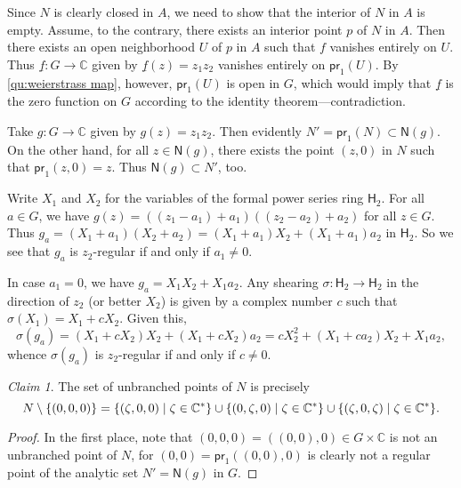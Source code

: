 \documentclass[a4paper]{amsart}
\newcommand{\C}{\mathbb{C}}
\newcommand{\Zero}[1]{\mathsf{N}(#1)}
\newcommand{\RingH}[1]{\mathsf{H}_{#1}}
\newcommand{\pr}[1]{\mathsf{pr}_{#1}}
\theoremstyle{remark}
\newtheorem{claim}{Claim}[question]
\numberwithin{equation}{question}
\DeclarePairedDelimiter\set{\{}{\}}
\begin{document}
\begin{solution}%
\begin{solenum}
\item Since $N$ is clearly closed in $A$, we need to show that the interior of $N$ in $A$ is empty. Assume, to the contrary, there exists an interior point $p$ of $N$ in $A$. Then there exists an open neighborhood $U$ of $p$ in $A$ such that $f$ vanishes entirely on $U$. Thus $\underline f \colon G \to \C$ given by $\underline f(z) = z_1z_2$ vanishes entirely on $\pr1(U)$. By \cref{qu:weierstrass map}, however, $\pr1(U)$ is open in $G$, which would imply that $\underline f$ is the zero function on $G$ according to the identity theorem---contradiction.

\item Take $g \colon G \to \C$ given by $g(z) = z_1z_2$. Then evidently $N' = \pr1(N) \subset \Zero g$. On the other hand, for all $z \in \Zero g$, there exists the point $(z,0)$ in $N$ such that $\pr1(z,0) = z$. Thus $\Zero g \subset N'$, too.

\item Write $X_1$ and $X_2$ for the variables of the formal power series ring $\RingH2$. For all $a \in G$, we have $g(z) = ((z_1 - a_1) + a_1)((z_2 - a_2) + a_2)$ for all $z \in G$. Thus $g_a = (X_1 + a_1)(X_2 + a_2) = (X_1 + a_1)X_2 + (X_1 + a_1)a_2$ in $\RingH2$. So we see that $g_a$ is $z_2$-regular if and only if $a_1 \ne 0$.

In case $a_1 = 0$, we have $g_a = X_1X_2 + X_1a_2$. Any shearing $\sigma \colon \RingH2 \to \RingH2$ in the direction of $z_2$ (or better $X_2$) is given by a complex number $c$ such that $\sigma(X_1) = X_1 + cX_2$. Given this,
\[
\sigma(g_a) = (X_1 + cX_2)X_2 + (X_1 + cX_2)a_2 = cX_2^2 + (X_1 + ca_2)X_2 + X_1a_2,
\]
whence $\sigma(g_a)$ is $z_2$-regular if and only if $c \ne 0$.

\item \begin{claim} The set of unbranched points of $N$ is precisely
\[
N \setminus \set{(0,0,0)} = \set{(\zeta,0,0) \mid \zeta \in \C^*} \cup \set{(0,\zeta,0) \mid \zeta \in \C^*} \cup \set{(\zeta,0,\zeta) \mid \zeta \in \C^*}.
\]
\end{claim}

\begin{proof}
In the first place, note that $(0,0,0) = ((0,0),0) \in G \times \C$ is not an unbranched point of $N$, for $(0,0) = \pr1((0,0),0)$ is clearly not a regular point of the analytic set $N' = \Zero g$ in $G$.


\end{proof}
\end{solenum}
\end{solution}
\end{document}

